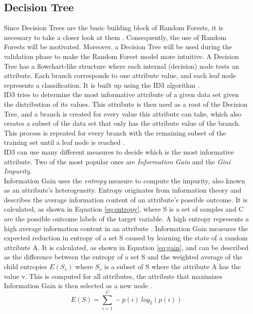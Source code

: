 \subsection{Decision Tree}
Since Decision Trees are the basic building block of Random Forests, it 
is necessary to take a closer look at them \cite{RN163}. Consequently, the use 
of Random Forests will be motivated. Moreover, a Decision Tree will be used 
during the validation phase to make the Random Forest model more intuitive.
A Decision Tree has a flowchart-like structure where each internal (decision) 
node tests an attribute. Each branch corresponds to one attribute value, and 
each leaf node represents a classification. It is built up using the ID3 
algorithm \cite{RN171}.
\\
ID3 tries to determine the most informative attribute of a given data set given 
the distribution of its values. This attribute is then used as a root of the 
Decision Tree, and a branch is created for every value this attribute can take, 
which also creates a subset of the data set that only has the attribute value 
of the branch. This process is repeated for every branch with the remaining 
subset of the training set until a leaf node is reached \cite{RN165}.
\\
ID3 can use many different measures to decide which is the most informative 
attribute. Two of the most popular ones are \textit{Information Gain} and the 
\textit{Gini Impurity}.
\\
Information Gain uses the \textit{entropy} measure to compute the impurity, 
also known as an attribute's heterogeneity. Entropy originates from information 
theory and describes the average information content of an attribute's possible 
outcome. It is calculated, as shown in Equation \ref{eq:entropy}, where S is a 
set of samples and C are the possible outcome labels of the target variable. A 
high entropy represents a high average 
information content in an attribute \cite{RN167}. Information Gain measures the 
expected reduction in entropy of a set S caused by learning the state of a 
random attribute A.  It is calculated, as shown in Equation \ref{eq:gain}, and 
can be described as the difference between the entropy of a set S and the 
weighted average of the child entropies $E(S_v)$ where $S_v$ is a subset of S 
where the attribute A has the value v. This is computed for all 
attributes, the attribute that maximizes Information Gain is then selected as a 
new node \cite{RN165}.
\begin{equation}
 E(S) = \sum_{i=1}^C -p(i) \ log_2(p(i))
 \label{eq:entropy}
\end{equation}
